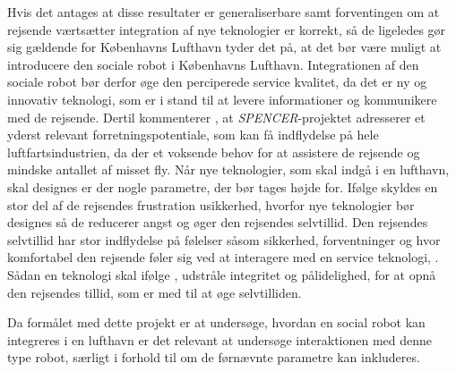 Hvis det antages at disse resultater er generaliserbare samt forventingen om at rejsende værtsætter integration af nye teknologier er korrekt, så de ligeledes gør sig gældende for Københavns Lufthavn tyder det på, at det bør være muligt at introducere den sociale robot i Københavns Lufthavn. Integrationen af den sociale robot bør derfor øge den perciperede service kvalitet, da det er ny og innovativ teknologi, som er i stand til at levere informationer og kommunikere med de rejsende. Dertil kommenterer \textcite[s. 609]{PDF:SpencerProject}, at \textit{SPENCER}-projektet adresserer et yderst relevant forretningspotentiale, som kan få indflydelse på hele luftfartsindustrien, da der et voksende behov for at assistere de rejsende og mindske antallet af misset fly.\blankline
%
Når nye teknologier, som skal indgå i en lufthavn, skal designes er der nogle parametre, der bør tages højde for. Ifølge \textcite[s. 352]{PDF:TheImpactOfTraveler} skyldes en stor del af de rejsendes frustration usikkerhed, hvorfor nye teknologier bør designes så de reducerer angst og øger den rejsendes selvtillid. Den rejsendes selvtillid har stor indflydelse på følelser såsom sikkerhed, forventninger og hvor komfortabel den rejsende føler sig ved at interagere med en service teknologi, \parencite[s. 353]{PDF:TheImpactOfTraveler}. Sådan en teknologi skal ifølge \textcite[s. 353]{PDF:TheImpactOfTraveler}, udstråle integritet og pålidelighed, for at opnå den rejsendes tillid, som er med til at øge selvtilliden.

Da formålet med dette projekt er at undersøge, hvordan en social robot kan integreres i en lufthavn er det relevant at undersøge interaktionen med denne type robot, særligt i forhold til om de førnævnte parametre kan inkluderes.
